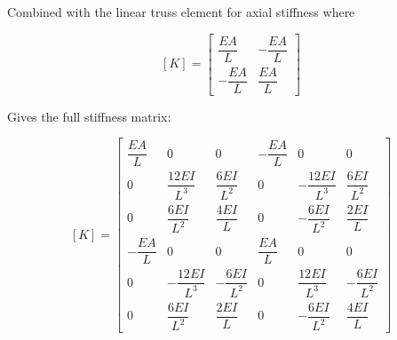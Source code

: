 \documentclass[a4paper]{article}
\begin{document}
Combined with the linear truss element for axial stiffness where

\begin{dmath*}
    \left[K\right] =
    \begin{bmatrix}
        \dfrac{EA}{L} & -\dfrac{EA}{L} \\[1em]
        -\dfrac{EA}{L} & \dfrac{EA}{L}
    \end{bmatrix}
\end{dmath*}

Gives the full stiffness matrix:

\begin{dmath*}
    \left[K\right] =
    \begin{bmatrix}
        \dfrac{EA}{L}   & 0                     & 0                     & -\dfrac{EA}{L}    & 0                     & 0 \\[1em]
        0               & \dfrac{12EI}{L^{3}}   & \dfrac{6EI}{L^{2}}    & 0                 & -\dfrac{12EI}{L^{3}}  & \dfrac{6EI}{L^{2}} \\[1em]
        0               & \dfrac{6EI}{L^{2}}    & \dfrac{4EI}{L}        & 0                 & -\dfrac{6EI}{L^{2}}   & \dfrac{2EI}{L} \\[1em]
        -\dfrac{EA}{L}  & 0                     & 0                     & \dfrac{EA}{L}     & 0                     & 0 \\[1em]
        0               & -\dfrac{12EI}{L^{3}}  & -\dfrac{6EI}{L^{2}}   & 0                 & \dfrac{12EI}{L^{3}}   & -\dfrac{6EI}{L^{2}} \\[1em]
        0               & \dfrac{6EI}{L^{2}}    & \dfrac{2EI}{L}        & 0                 & -\dfrac{6EI}{L^{2}}   & \dfrac{4EI}{L}
    \end{bmatrix}
\end{dmath*}
\end{document}
